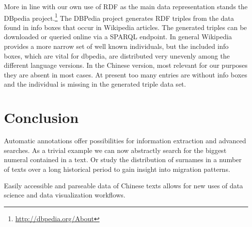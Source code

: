 \documentclass[12pt, draft]{article}
\begin{document}
More in line with our own use of RDF as the main data representation
stands the DBpedia project.\footnote{\url{http://dbpedia.org/About}}
The DBPedia project generates RDF triples from the data found in info boxes that occur in Wikipedia articles.
The generated triples can be downloaded or queried online via a SPARQL endpoint.
In general Wikipedia provides a more narrow set of well known individuals,
but the included info boxes, which are vital for dbpedia, are distributed
very unevenly among the different language versions. In the Chinese version,
most relevant for our purposes they are absent in most cases.
At present too many entries
are without info boxes and the individual is missing in the generated triple data set.

\section{Conclusion}
Automatic annotations offer possibilities for information extraction and
advanced searches.  As a trivial example we can now abstractly search for the biggest
numeral contained in a text. Or study the distribution of surnames in a number of texts
over a long historical period to gain insight into migration patterns.

Easily accessible and parseable data of Chinese texts allows for new
uses of data science and data visualization workflows.

\end{document}

